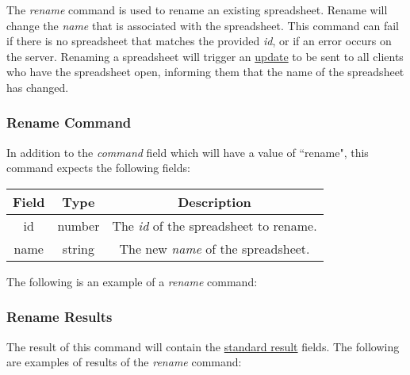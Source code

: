 The \emph{rename} command is used to rename an existing spreadsheet. Rename will 
change the \emph{name} that is associated with the spreadsheet. This command 
can fail if there is no spreadsheet that matches the provided \emph{id}, or 
if an error occurs on the server. Renaming a spreadsheet will trigger an 
\hyperref[lst:update:rename]{update} to be sent to all clients who have the 
spreadsheet open, informing them that the name of the spreadsheet has changed.

\subsubsection{Rename Command}
In addition to the \emph{command} field which will have a value of ``rename", this command expects the following fields:

\begin{table}[H]
    \begin{center}
        \begin{tabular}{|c|c|c|}\hline
            Field & Type & Description \\\hline
            id & number & The \emph{id} of the spreadsheet to rename. \\\hline
            name & string & The new \emph{name} of the spreadsheet. \\\hline
        \end{tabular}
    \end{center}
\end{table}

The following is an example of a \emph{rename} command:


\subsubsection{Rename Results}
The result of this command will contain the \hyperref[sec:message:result]{standard result} fields.
The following are examples of results of the \emph{rename} command:





